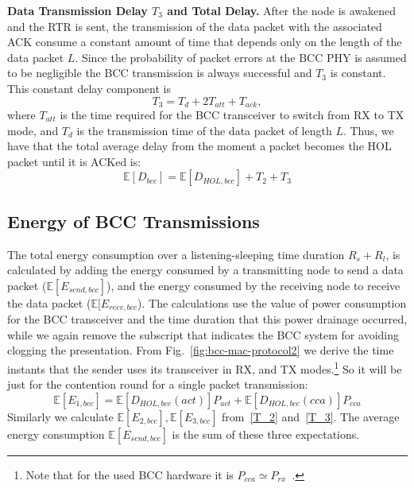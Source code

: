 \documentclass[10pt]{IEEEtran}
\newcounter{section:outage-analysis}
\begin{document}
\textbf{Data Transmission Delay $T_3$ and Total Delay.} After the node is awakened and the RTR is sent, the transmission of the data packet with the associated ACK consume a constant amount of time that depends only on the length of the data packet $L$. Since the probability of packet errors at the BCC PHY is assumed to be negligible the BCC transmission is always successful and $T_3$ is constant. This constant delay component is
\begin{equation}\label{T_3}
T_3=T_{d}+2T_{att}+T_{ack},
\end{equation}
where $T_{att}$ is the time required for the BCC transceiver to switch from RX to TX mode, and $T_d$ is the transmission time of the data packet of length $L$. Thus, we have that the total average delay from the moment a packet becomes the HOL packet until it is ACKed is:
\begin{equation}
\mathbb{E}[D_{bcc}]=\mathbb{E}[D_{HOL,bcc}]+T_{2}+T_{3}
\end{equation}

\subsection{Energy of BCC Transmissions}
The total energy consumption over a listening-sleeping time duration $R_s + R_l$, is calculated by adding the energy consumed by a transmitting node to send a data packet ($\mathbb{E}[E_{send,bcc}]$), and the energy consumed by the receiving node to receive the data packet ($\mathbb{E}[E_{recv,bcc}$). The calculations use the value of power consumption for the BCC transceiver and the time duration that this power drainage occurred, while we again remove the subscript that indicates the BCC system for avoiding clogging the presentation. From Fig.~\ref{fig:bcc-mac-protocol2} we derive the time instants that the sender uses its transceiver in RX, and TX modes.\footnote{Note that for the used BCC hardware it is $P_{cca}\simeq P_{rx}$~\cite{fazzi09}.} So it will be just for the contention round for a single packet transmission:
\begin{equation}\label{E_1_bcc}
    \mathbb{E}[E_{1,bcc}]= \mathbb{E}[D_{HOL,bcc}(act)] P_{act} +\mathbb{E}[D_{HOL,bcc}(cca)] P_{cca}
\end{equation}
Similarly we calculate $\mathbb{E}[E_{2,bcc}],\mathbb{E}[E_{3,bcc}]$ from~\eqref{T_2} and~\eqref{T_3}. The average energy consumption $\mathbb{E}[E_{send,bcc}]$ is the sum of these three expectations.
\end{document}
